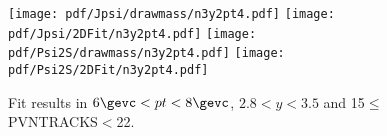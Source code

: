 \begin{figure}[H]
\begin{center}
\texttt{[image: pdf/Jpsi/drawmass/n3y2pt4.pdf]}
\texttt{[image: pdf/Jpsi/2DFit/n3y2pt4.pdf]}
\vspace*{-0.5cm}
\texttt{[image: pdf/Psi2S/drawmass/n3y2pt4.pdf]}
\texttt{[image: pdf/Psi2S/2DFit/n3y2pt4.pdf]}
\vspace*{-0.5cm}
\end{center}
\caption{Fit results in $6\gevc<pt<8\gevc$, $2.8<y<3.5$ and 15$\leq$PVNTRACKS$<$22.}
\label{Fitn3y2pt4}
\end{figure}
